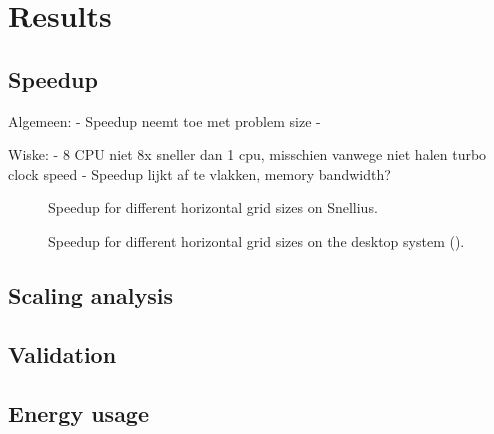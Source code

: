 \chapter{Results}

\section{Speedup}

Algemeen:
- Speedup neemt toe met problem size
- 

Wiske:
- 8 CPU niet 8x sneller dan 1 cpu, misschien vanwege niet halen turbo clock speed
- Speedup lijkt af te vlakken, memory bandwidth?



\begin{figure}[h!]
    \centering
    
    \caption{Speedup for different horizontal grid sizes on Snellius.}
    \label{fig:speedup_snellius}
\end{figure}

\begin{figure}[h!]
    \centering
    
    \caption{Speedup for different horizontal grid sizes on the desktop system ().}
    \label{fig:speedup_desktop}
\end{figure}

\section{Scaling analysis}

\begin{figure}
    \centering
    
\end{figure}

\begin{figure}
    \centering
    
\end{figure}

\section{Validation}

\section{Energy usage}